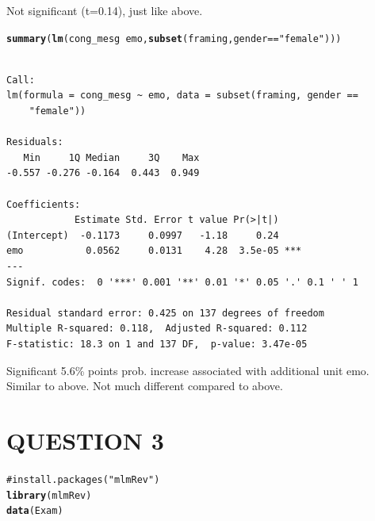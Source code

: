 \documentclass{article}\usepackage{graphicx, color}
\makeatletter
\newcommand{\hlfunctioncall}[1]{\textcolor[rgb]{0.501960784313725,0,0.329411764705882}{\textbf{#1}}}%
\newcommand{\hlstring}[1]{\textcolor[rgb]{0.6,0.6,1}{#1}}%
\newcommand{\hlcomment}[1]{\textcolor[rgb]{0.180392156862745,0.6,0.341176470588235}{#1}}%
\newenvironment{kframe}{%
 \def\at@end@of@kframe{}%
 \ifinner\ifhmode%
  \def\at@end@of@kframe{\end{minipage}}%
  \begin{minipage}{\columnwidth}%
 \fi\fi%
 \def\FrameCommand##1{\hskip\@totalleftmargin \hskip-\fboxsep
 \colorbox{shadecolor}{##1}\hskip-\fboxsep
     \hskip-\linewidth \hskip-\@totalleftmargin \hskip\columnwidth}%
 \MakeFramed {\advance\hsize-\width
   \@totalleftmargin\z@ \linewidth\hsize
   \@setminipage}}%
 {\par\unskip\endMakeFramed%
 \at@end@of@kframe}
\newenvironment{knitrout}{}{} %
\makeatother
\begin{document}
Not significant (t=0.14), just like above.
\begin{knitrout}
\color{fgcolor}\begin{kframe}
\begin{alltt}
\hlfunctioncall{summary}(\hlfunctioncall{lm}(cong_mesg ~ emo,\hlfunctioncall{subset}(framing,gender==\hlstring{"female"})))
\end{alltt}
\begin{verbatim}

Call:
lm(formula = cong_mesg ~ emo, data = subset(framing, gender == 
    "female"))

Residuals:
   Min     1Q Median     3Q    Max 
-0.557 -0.276 -0.164  0.443  0.949 

Coefficients:
            Estimate Std. Error t value Pr(>|t|)    
(Intercept)  -0.1173     0.0997   -1.18     0.24    
emo           0.0562     0.0131    4.28  3.5e-05 ***
---
Signif. codes:  0 '***' 0.001 '**' 0.01 '*' 0.05 '.' 0.1 ' ' 1 

Residual standard error: 0.425 on 137 degrees of freedom
Multiple R-squared: 0.118,	Adjusted R-squared: 0.112 
F-statistic: 18.3 on 1 and 137 DF,  p-value: 3.47e-05 
\end{verbatim}
\end{kframe}
\end{knitrout}

Significant 5.6\% points prob. increase associated with additional unit emo. Similar to above. Not much different compared to above.

\newpage
\section*{QUESTION 3}
\begin{knitrout}
\color{fgcolor}\begin{kframe}
\begin{alltt}
\hlcomment{#install.packages("mlmRev")}
\hlfunctioncall{library}(mlmRev)
\hlfunctioncall{data}(Exam)
\end{alltt}
\end{kframe}
\end{knitrout}
\end{document}
